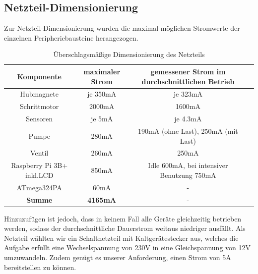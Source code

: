 \newpage

\subsection{Netzteil-Dimensionierung}

Zur Netzteil-Dimensionierung wurden die maximal möglichen Stromwerte der einzelnen Peripheriebausteine herangezogen.

\begin{table}[h]
    \centering
    \begin{tabular}{|c|c|c|c|}
        \hline
        \textbf{Komponente} & \textbf{maximaler Strom} & \textbf{gemessener Strom im durchschnittlichen Betrieb} \\ \hline
        Hubmagnete & je 350mA & je 323mA \\ \hline
        Schrittmotor & 2000mA & 1600mA \\ \hline
        Sensoren & je 5mA & je 4.3mA \\ \hline
        Pumpe & 280mA & 190mA (ohne Last), 250mA (mit Last) \\ \hline
        Ventil & 260mA & 250mA \\ \hline
        Raspberry Pi 3B+ inkl.\acs{LCD} & 850mA & Idle 600mA, bei intensiver Benutzung 750mA \\ \hline
        ATmega324PA & 60mA & - \\ \hline
        \textbf{Summe} & \textbf{4165mA} & - \\ \hline
    \end{tabular}
    \caption{Überschlagsmäßige Dimensionierung des Netzteils}
\end{table}

Hinzuzufügen ist jedoch, dass in keinem Fall alle Geräte gleichzeitig betrieben werden, sodass der durchschnittliche Dauerstrom weitaus niedriger ausfällt.
Als Netzteil wählten wir ein Schaltnetzteil mit Kaltgerätestecker aus, welches die Aufgabe erfüllt eine Wechselspannung von 230V in eine Gleichspannung von 12V umzuwandeln.
Zudem genügt es unserer Anforderung, einen Strom von 5A bereitstellen zu können.

